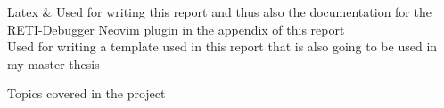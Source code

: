 \documentclass{report}
\begin{document}
\begin{table}[H]
\begin{tblr}
		Latex                  & {\hspace{\dimexpr\labelsep+0.5\tabcolsep}Used for writing this report and thus also the documentation for the RETI-Debugger Neovim plugin in the appendix of this report                                                                                                                  \\\hspace{\dimexpr\labelsep+0.5\tabcolsep}Used for writing a template used in this report that is also going to be used in my master thesis}\\
	\end{tblr}
	\caption{Topics covered in the project}
	\label{tab:topics}
\end{table}

\end{document}
